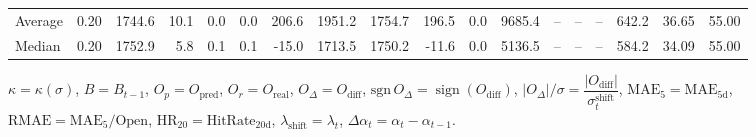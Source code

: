 \begin{threeparttable}
{\begin{tabular}{lrrrrrrrrrrrrrrrrr}
Average &     0.20 & 1744.6 &              10.1 &               0.0 &                0.0 &              206.6 & 1951.2 & 1754.7 &      196.5 &                      0.0 &              9685.4 &         -- &        -- &             -- &            642.2 &           36.65 &                  55.00 \\
 Median &     0.20 & 1752.9 &               5.8 &               0.1 &                0.1 &              -15.0 & 1713.5 & 1750.2 &      -11.6 &                      0.0 &              5136.5 &         -- &        -- &             -- &            584.2 &           34.09 &                  55.00 \\
\bottomrule
\end{tabular}
}
\begin{tablenotes}\footnotesize
\item $\kappa=\kappa(\sigma)$, $B=B_{t-1}$, $O_p=O_{\text{pred}}$, $O_r=O_{\text{real}}$, $O_\Delta=O_{\text{diff}}$, $\mathrm{sgn}\,O_\Delta=\operatorname{sign}(O_{\text{diff}})$, $|O_\Delta|/\sigma=\dfrac{|O_{\text{diff}}|}{\sigma_t^{\text{shift}}}$, $\mathrm{MAE}_5=\mathrm{MAE}_{5\text{d}}$, $\mathrm{RMAE}= \mathrm{MAE}_5 / \text{Open}$, $\mathrm{HR}_{20}=\mathrm{HitRate}_{20\text{d}}$, 
$\lambda_{\text{shift}}=\lambda_t$, 
$\Delta\alpha_t=\alpha_t-\alpha_{t-1}$.
\end{tablenotes}
\end{threeparttable}
\endgroup

